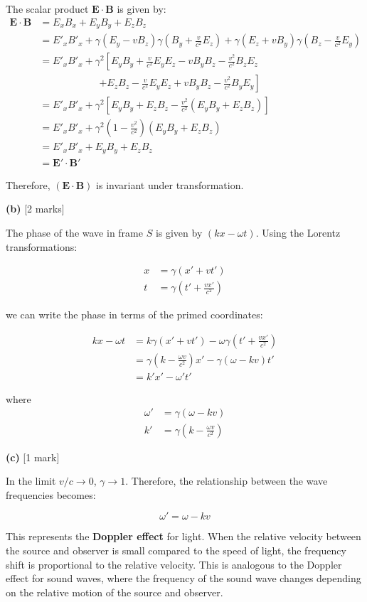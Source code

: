 \documentclass{article}
\begin{document}
The scalar product $\mathbf{E} \cdot \mathbf{B}$ is given by:
\begin{align*}
\mathbf{E} \cdot \mathbf{B} &= E_x B_x + E_y B_y + E_z B_z \\
&= E'_x B'_x + \gamma (E_y - v B_z) \gamma \left( B_y + \frac{v}{c^2} E_z \right) + \gamma (E_z + v B_y) \gamma \left( B_z - \frac{v}{c^2} E_y \right) \\
&= E'_x B'_x + \gamma^2 \left[ E_y B_y + \frac{v}{c^2} E_y E_z - v B_y B_z - \frac{v^2}{c^2} B_z E_z  \right. \\
&\qquad \qquad \qquad \left. + E_z B_z - \frac{v}{c^2} E_y E_z + v B_y B_z - \frac{v^2}{c^2} B_y E_y \right] \\
&= E'_x B'_x + \gamma^2 \left[ E_y B_y + E_z B_z - \frac{v^2}{c^2} (E_y B_y + E_z B_z) \right] \\
&= E'_x B'_x + \gamma^2 \left( 1 - \frac{v^2}{c^2} \right) (E_y B_y + E_z B_z) \\
&= E'_x B'_x + E_y B_y + E_z B_z \\
&= \mathbf{E'} \cdot \mathbf{B'}
\end{align*}

Therefore, $(\mathbf{E} \cdot \mathbf{B})$ is invariant under transformation.

\textbf{(b)} [2 marks]

The phase of the wave in frame $S$ is given by $(kx - \omega t)$.  Using the Lorentz transformations:

\begin{align*}
x &= \gamma (x' + vt') \\
t &= \gamma \left( t' + \frac{vx'}{c^2} \right)
\end{align*}

we can write the phase in terms of the primed coordinates:

\begin{align*}
kx - \omega t &= k \gamma (x' + vt') - \omega \gamma \left( t' + \frac{vx'}{c^2} \right) \\
&= \gamma \left( k - \frac{\omega v}{c^2} \right) x' - \gamma (\omega - kv) t' \\
&= k'x' - \omega' t'
\end{align*}

where 
\begin{align*}
\omega' &= \gamma (\omega - k v) \\
k' &= \gamma \left( k - \frac{\omega v}{c^2} \right)
\end{align*}

\textbf{(c)} [1 mark]

In the limit $v/c \to 0$, $\gamma \to 1$. Therefore, the relationship between the wave frequencies becomes:

\[
\omega' = \omega - kv
\]

This represents the \textbf{Doppler effect} for light. When the relative velocity between the source and observer is small compared to the speed of light, the frequency shift is proportional to the relative velocity. This is analogous to the Doppler effect for sound waves, where the frequency of the sound wave changes depending on the relative motion of the source and observer.
\end{document}
